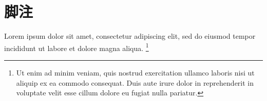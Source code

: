 \section{脚注}

Lorem ipsum dolor sit amet, consectetur adipiscing elit, sed do eiusmod tempor
incididunt ut labore et dolore magna aliqua.
\footnote{Ut enim ad minim veniam, quis nostrud exercitation ullamco laboris
  nisi ut aliquip ex ea commodo consequat.
  Duis aute irure dolor in reprehenderit in voluptate velit esse cillum dolore
  eu fugiat nulla pariatur.}

